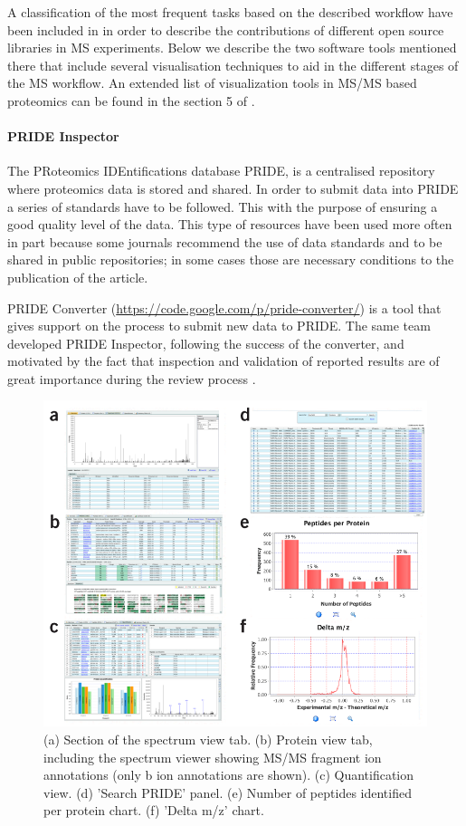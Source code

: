 A classification of the most frequent tasks based on the described workflow have been included in \cite{PER2014} in order to describe the contributions of different open source libraries in MS experiments. Below we describe the two software tools mentioned there that include several visualisation techniques to aid in the different stages of the MS workflow. An extended list of visualization tools in MS/MS based proteomics can be found in the section 5 of \cite{JAC2010}.

\paragraph{PRIDE Inspector}
The PRoteomics IDEntifications database PRIDE, is a centralised repository where proteomics data is stored and shared. In order to submit data into PRIDE a series of standards have to be followed. This with the purpose of ensuring a good quality level of  the data. This type of resources have been used more often in part because some journals recommend the use of data standards and to be shared in public repositories; in some cases those are necessary conditions to the publication of the article.

PRIDE Converter  (\url{https://code.google.com/p/pride-converter/}) is a tool that gives support on the process to submit new data to PRIDE. The same team developed PRIDE Inspector, following the success of the converter, and motivated by the fact that inspection and validation of reported results are of great importance during the review process \cite{WAN2012}.

\begin{figure}  
\centering
\includegraphics[width=\textwidth]{figures/prideinspector.png}
\caption[Views on the PRIDE inspector toolset.]{(a) Section of the spectrum view tab. (b) Protein view tab, including the spectrum viewer showing MS/MS fragment ion annotations (only b ion annotations are shown). (c) Quantification view. (d) 'Search PRIDE' panel. (e) Number of peptides identified per protein chart. (f) 'Delta m/z' chart.
\label{fig:pride}}
\end{figure}

